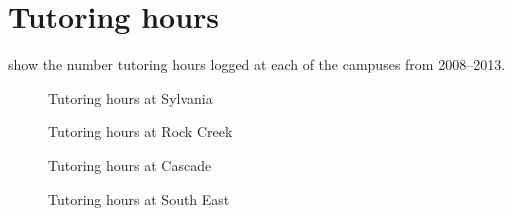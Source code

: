 \chapter{Tutoring hours}\label{app:sec:tutoringhours}

 show
the number tutoring hours logged at each of the campuses from 2008--2013.

\begin{figure}[!htb]
	\captionsetup{skip=0pt}
  \begin{widepage}
  \begin{minipage}{.4\textwidth}
    \centering
	
    \caption{Tutoring hours at Sylvania}
    \label{app:fig:tutoringsylvania}
  \end{minipage}%
  \hfill
  \begin{minipage}{.4\textwidth}
    \centering
	
    \caption{Tutoring hours at Rock Creek}
    \label{app:fig:tutoringrockcreek}
  \end{minipage}%
  \end{widepage}
\end{figure}

\begin{figure}[!htb]
	\captionsetup{skip=0pt}
  \begin{widepage}
  \begin{minipage}{.4\textwidth}
    \centering
	
    \caption{Tutoring hours at Cascade}
    \label{app:fig:tutoringCascade}
  \end{minipage}%
  \hfill
  \begin{minipage}{.4\textwidth}
    \centering
	
    \caption{Tutoring hours at South East}
    \label{app:fig:tutoringsoutheast}
  \end{minipage}%
  \end{widepage}
\end{figure}
